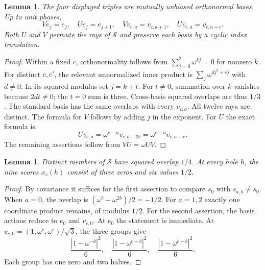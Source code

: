 \documentclass[11pt,a4paper]{article}
\newtheorem{lemma}[theorem]{Lemma}
\theoremstyle{remark}
\numberwithin{equation}{section}
\begin{document}
\begin{lemma}\label{lem:actions}
The four displayed triples are mutually unbiased orthonormal bases. Up to unit phases,
\[
 Ve_j=e_j,\quad Ue_j=e_{j+1},\quad
 Vv_{c,a}=v_{c,a+1},\quad Uv_{c,a}=v_{c,a+c}.
\]
Both $U$ and $V$ permute the rays of $\mathcal S$ and preserve each basis by a cyclic index translation.
\end{lemma}
\begin{proof}
Within a fixed $c$, orthonormality follows from $\sum_{j=0}^2\omega^{kj}=0$ for nonzero $k$. For distinct $c,c'$, the relevant unnormalized inner product is $\sum_j\omega^{dj^2+ej}$ with $d\ne0$. In its squared modulus set $j=k+t$. For $t\ne0$, summation over $k$ vanishes because $2dt\ne0$; the $t=0$ sum is three. Cross-basis squared overlaps are thus $1/3$. The standard basis has the same overlaps with every $v_{c,a}$. All twelve rays are distinct.
The formula for $V$ follows by adding $j$ in the exponent. For $U$ the exact formula is
\[
 Uv_{c,a}=\omega^{c-a}v_{c,a-2c}=\omega^{c-a}v_{c,a+c}.
\]
The remaining assertions follow from $VU=\omega UV$.
\end{proof}

\begin{lemma}\label{lem:overlap}
Distinct members of $\mathcal S$ have squared overlap $1/4$. At every hole $h$, the nine scores $x_s(h)$ consist of three zeros and six values $1/2$.
\end{lemma}
\begin{proof}
By covariance it suffices for the first assertion to compare $s_0$ with $s_{a,b}\ne s_0$. When $a=0$, the overlap is $(\omega^b+\omega^{2b})/2=-1/2$. For $a=1,2$ exactly one coordinate product remains, of modulus $1/2$. For the second assertion, the basis actions reduce to $e_0$ and $v_{c,0}$. At $e_0$ the statement is immediate. At $v_{c,0}=(1,\omega^c,\omega^c)/\sqrt3$, the three groups give
\[
 \frac{|1-\omega^{-b}|^2}{6},\quad
 \frac{|1-\omega^{c+b}|^2}{6},\quad
 \frac{|1-\omega^{c-b}|^2}{6}.
\]
Each group has one zero and two halves.
\end{proof}
\end{document}
